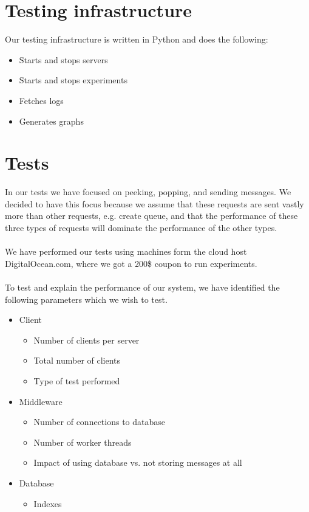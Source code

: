 \documentclass{article}
\begin{document}
    \section{Testing infrastructure}
        Our testing infrastructure is written in Python and does the following:
        \begin{itemize}
            \item Starts and stops servers
            \item Starts and stops experiments
            \item Fetches logs
            \item Generates graphs
        \end{itemize}

    \section{Tests}
        In our tests we have focused on peeking, popping, and sending messages. We decided to have this focus because we assume that these requests are sent vastly more than other requests, e.g. create queue, and that the performance of these three types of requests will dominate the performance of the other types.\\
        \\
        We have performed our tests using machines form the cloud host DigitalOcean.com, where we got a 200\$ coupon to run experiments.\\
        \\
        To test and explain the performance of our system, we have identified the following parameters which we wish to test.
        \begin{itemize}
            \item Client
            \begin{itemize}
                \item Number of clients per server
                \item Total number of clients
                \item Type of test performed
            \end{itemize}
            \item Middleware
            \begin{itemize}
                \item Number of connections to database
                \item Number of worker threads
                \item Impact of using database vs. not storing messages at all
            \end{itemize}
            \item Database
            \begin{itemize}
                \item Indexes
            \end{itemize}
        \end{itemize}
\end{document}
